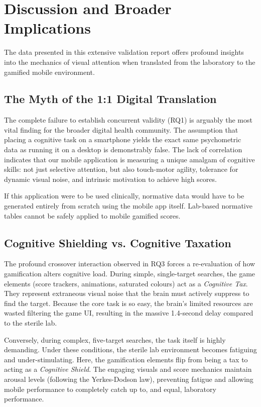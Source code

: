 \documentclass[11pt,a4paper]{article}
\begin{document}
\section{Discussion and Broader Implications}
\label{sec:discussion}

The data presented in this extensive validation report offers profound insights into the mechanics of visual attention when translated from the laboratory to the gamified mobile environment. 

\subsection{The Myth of the 1:1 Digital Translation}
The complete failure to establish concurrent validity (RQ1) is arguably the most vital finding for the broader digital health community. The assumption that placing a cognitive task on a smartphone yields the exact same psychometric data as running it on a desktop is demonstrably false. The lack of correlation indicates that our mobile application is measuring a unique amalgam of cognitive skills: not just selective attention, but also touch-motor agility, tolerance for dynamic visual noise, and intrinsic motivation to achieve high scores.

If this application were to be used clinically, normative data would have to be generated entirely from scratch using the mobile app itself. Lab-based normative tables cannot be safely applied to mobile gamified scores.

\subsection{Cognitive Shielding vs. Cognitive Taxation}
The profound crossover interaction observed in RQ3 forces a re-evaluation of how gamification alters cognitive load. 
During simple, single-target searches, the game elements (score trackers, animations, saturated colours) act as a \textit{Cognitive Tax}. They represent extraneous visual noise that the brain must actively suppress to find the target. Because the core task is so easy, the brain's limited resources are wasted filtering the game UI, resulting in the massive 1.4-second delay compared to the sterile lab.

Conversely, during complex, five-target searches, the task itself is highly demanding. Under these conditions, the sterile lab environment becomes fatiguing and under-stimulating. Here, the gamification elements flip from being a tax to acting as a \textit{Cognitive Shield}. The engaging visuals and score mechanics maintain arousal levels (following the Yerkes-Dodson law), preventing fatigue and allowing mobile performance to completely catch up to, and equal, laboratory performance.
\end{document}
